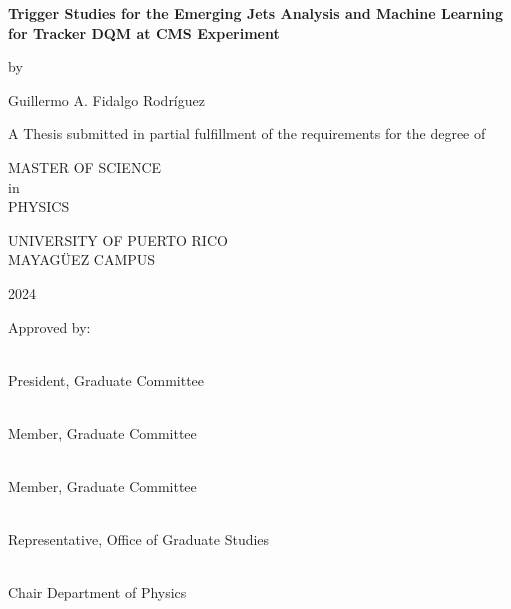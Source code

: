 \begin{titlepage}
	\begin{center}

		{\large
			\textbf{ \vspace{1mm} Trigger Studies for the Emerging Jets Analysis and Machine Learning for Tracker DQM at CMS Experiment}\\
		}

		\vspace{5mm}

		by\\

		\vspace{5mm}

		Guillermo A. Fidalgo Rodríguez

		\vspace{5mm}

		A Thesis submitted in partial fulfillment of the requirements for the degree of\\

		\vspace{5mm}

		MASTER OF SCIENCE \\
		in\\
		PHYSICS\\

		\vspace{5mm}

		UNIVERSITY OF PUERTO RICO\\
		MAYAGÜEZ CAMPUS\\

		\vspace{5mm}

		2024
	\end{center}

	\vfill

	Approved by:

	\vspace{1.0cm}

	\\President, Graduate Committee

	\vspace{1.0cm}

	\\Member, Graduate Committee
	\vspace{1.0cm}

	\\Member, Graduate Committee
	\vspace{1.0cm}


	\SignatureAndDate{}
	\\Representative, Office of Graduate Studies
	\vspace{1.0cm}

	\\Chair Department of Physics

\end{titlepage}
